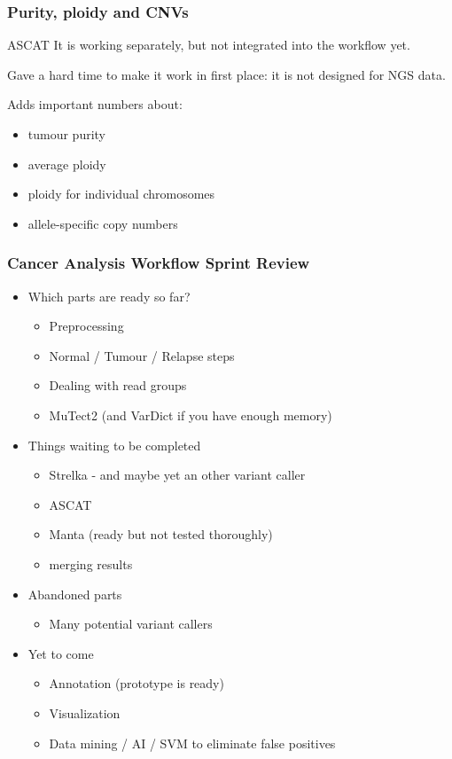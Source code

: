 \documentclass{beamer}
\begin{document}
\begin{frame}
\frametitle{Purity, ploidy and CNVs}
\begin{block}{ASCAT}
	It is working separately, but not integrated into the workflow yet.

	Gave a hard time to make it work in first place: it is not designed for NGS data.
	
	Adds important numbers about:
	\begin{itemize}
		\item tumour purity
		\item average ploidy
		\item ploidy for individual chromosomes
		\item allele-specific copy numbers
	\end{itemize}
\end{block}
\end{frame}

\begin{frame}
\frametitle{Cancer Analysis Workflow Sprint Review}
\begin{itemize}
	\item Which parts are ready so far?
		\begin{itemize}
			\item Preprocessing
			\item Normal / Tumour / Relapse steps
			\item Dealing with read groups
			\item MuTect2 (and VarDict if you have enough memory)
		\end{itemize}
	\item Things waiting to be completed
		\begin{itemize}
			\item Strelka - and maybe yet an other variant caller
			\item ASCAT
			\item Manta (ready but not tested thoroughly)
			\item merging results
		\end{itemize}
	\item Abandoned parts
		\begin{itemize}
			\item Many potential variant callers
		\end{itemize}
	\item Yet to come
		\begin{itemize}
			\item Annotation (prototype is ready)
			\item Visualization
			\item Data mining / AI / SVM to eliminate false positives
		\end{itemize}
\end{itemize}
\end{frame}
\end{document}
